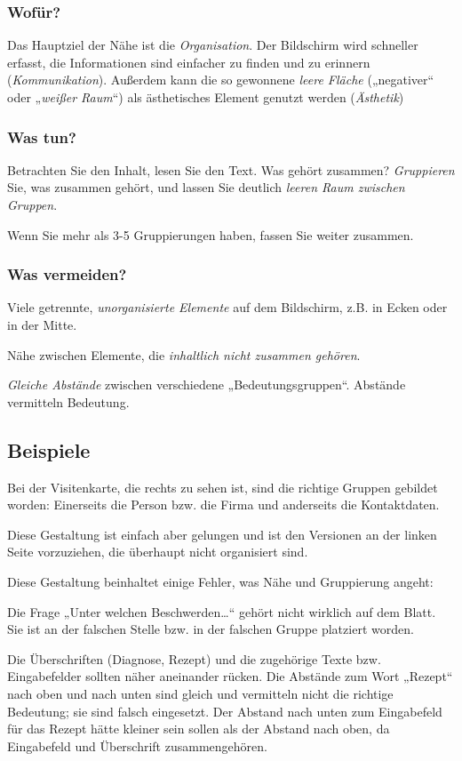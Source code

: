 \subsubsection*{Wofür?}
Das Hauptziel der Nähe ist die \emph{Organisation}. Der Bildschirm wird schneller erfasst, die Informationen sind einfacher zu finden und zu erinnern (\emph{Kommunikation}).
Außerdem kann die so gewonnene \emph{leere Fläche} („negativer“ oder „\emph{weißer Raum}“) als ästhetisches Element genutzt werden (\emph{Ästhetik})

\subsubsection*{Was tun?}
Betrachten Sie den Inhalt, lesen Sie den Text. Was gehört zusammen?
\emph{Gruppieren} Sie, was zusammen gehört, und lassen Sie deutlich \emph{leeren Raum zwischen Gruppen}.

Wenn Sie mehr als 3-5 Gruppierungen haben, fassen Sie weiter zusammen.

\subsubsection*{Was vermeiden?}
Viele getrennte, \emph{unorganisierte Elemente} auf dem Bildschirm, z.B. in Ecken oder in der Mitte.

Nähe zwischen Elemente, die \emph{inhaltlich nicht zusammen gehören}.

\emph{Gleiche Abstände} zwischen verschiedene „Bedeutungsgruppen“. Abstände vermitteln Bedeutung.

\subsection{Beispiele}
Bei der Visitenkarte, die rechts zu sehen ist, sind die richtige Gruppen gebildet worden: Einerseits die Person bzw. die Firma und anderseits die Kontaktdaten.

Diese Gestaltung ist einfach aber gelungen und ist den Versionen an der linken Seite vorzuziehen, die überhaupt nicht organisiert sind.

Diese Gestaltung beinhaltet einige Fehler, was Nähe und Gruppierung angeht:

Die Frage „Unter welchen Beschwerden…“  gehört nicht wirklich auf dem Blatt. Sie ist an der falschen Stelle bzw. in der falschen Gruppe platziert worden.
 
Die Überschriften (Diagnose, Rezept) und die zugehörige Texte bzw. Eingabefelder sollten näher aneinander rücken. Die Abstände zum Wort „Rezept“ nach oben und nach unten sind gleich und vermitteln nicht die richtige Bedeutung; sie sind falsch eingesetzt. Der Abstand nach unten zum Eingabefeld für das Rezept hätte kleiner sein sollen als der Abstand nach oben, da Eingabefeld und Überschrift zusammengehören.


